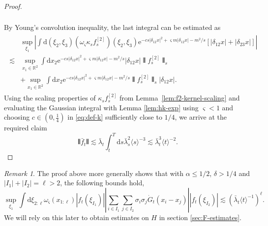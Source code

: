 \documentclass[11pt, a4paper]{scrartcl}
\numberwithin{equation}{section}
\theoremstyle{plain}
\theoremstyle{remark}
\newtheorem{remark}[foo]{Remark}
\newcommand{\mathd}{\mathrm{d}}
\newcommand{\mathe}{\mathrm{e}}
\begin{document}
\begin{proof}
\begin{align}
\begin{split}
      \end{split}
    \end{align} 
  By Young's convolution inequality, the last integral can be estimated as
    \begin{align*}
      \begin{split}
          & \sup_{\xi_1} \left| \int \mathd (\xi_2, \xi_3) (\omega_{\varsigma} \kappa_s f_s^{[2]}) (\xi_2, \xi_3) \mathe^{- cs | \delta_{12} x
          |^2 + \varsigma m | \delta_{12} x | - m^2 / s}  [| \delta_{12} x | + |
          \delta_{23} x |] \right|\\
          \lesssim & \sup_{x_1 \in \mathbb{R}^2}  \int \mathd x_2 \mathe^{- cs |
          \delta_{12} x |^2 + \varsigma m | \delta_{12} x | - m^2 / s} |
          \delta_{12} x |  \interleave f_s^{[2]} \interleave_s \\
          &+ \sup_{x_1 \in
          \mathbb{R}^2}  \int \mathd x_2 \mathe^{- cs | \delta_{12} x |^2 +
          \varsigma m | \delta_{12} x | - m^2 / s} \interleave f^{[2]}_s\interleave_s |
          \delta_{12} x |.
      \end{split}
    \end{align*}
  Using the scaling properties of $\kappa_s f_s^{[2]}$ from
  Lemma~\ref{lem:f2-kernel-scaling} and evaluating the Gaussian integral with
  Lemma \ref{lem:hk-exp} using $\varsigma < 1$ and choosing $c \in \left( 0,
  \frac{1}{4} \right)$ in \eqref{eq:def-k} sufficiently close to $1 / 4$, we
  arrive at the required claim
  \[ \interleave \bar{f}_t \interleave \lesssim \bar{\lambda}_t  \int_t^T \mathd s
     \bar{\lambda}_s^2 \langle s \rangle^{- 3} \lesssim \bar{\lambda}_t^3 \langle t
     \rangle^{- 2} . \]
\end{proof}

\begin{remark}
  \label{rem:h-estimates}The proof above more generally shows that with
  $\alpha \leqslant 1 / 2$, $\delta > 1 / 4$ and $| I_1 | + | I_2 | = \ell >
  2$, the following bounds hold,
  \begin{equation}
    \sup_{\xi_1}  \int \mathd \xi_{2 : \ell} \omega_{\varsigma} (x_{1 : \ell})
    | f_t (\xi_{I_1}) | \left| \sum_{i \in I_1} \sum_{j \in I_2} \sigma_i
    \sigma_j  \dot{G}_t (x_i - x_j) \right| | f_t  (\xi_{I_2}) | \lesssim
    (\bar{\lambda}_t \langle t \rangle^{- 1})^{\ell} \label{eq:h-estimates}.
  \end{equation}
  We will rely on this later to obtain estimates on $H$ in section \ref{sec:F-estimates}.
\end{remark}
\end{document}
